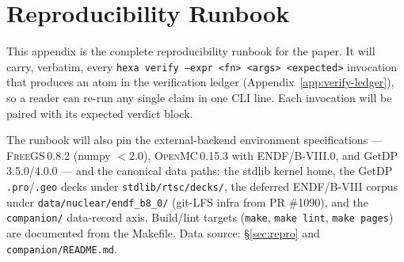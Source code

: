 \section{Reproducibility Runbook}
\label{app:repro}

This appendix is the complete reproducibility runbook for the paper.
It will carry, verbatim, every \texttt{hexa verify --expr <fn> <args>
<expected>} invocation that produces an atom in the verification
ledger (Appendix~\ref{app:verify-ledger}), so a reader can re-run any
single claim in one CLI line. Each invocation will be paired with its
expected verdict block.

The runbook will also pin the external-backend environment
specifications --- \textsc{FreeGS}\,0.8.2 (numpy $<\!2.0$),
\textsc{OpenMC}\,0.15.3 with ENDF/B-VIII.0, and GetDP\,3.5.0/4.0.0 ---
and the canonical data paths: the stdlib kernel home, the GetDP
\texttt{.pro}/\texttt{.geo} decks under
\texttt{stdlib/\allowbreak rtsc/\allowbreak decks/},
the deferred ENDF/B-VIII corpus under \texttt{data/nuclear/endf\_b8\_0/}
(git-LFS infra from PR \#1090), and the \texttt{companion/} data-record
axis. Build/lint targets (\texttt{make}, \texttt{make lint},
\texttt{make pages}) are documented from the Makefile. Data source:
\S\ref{sec:repro} and \texttt{companion/README.md}.

